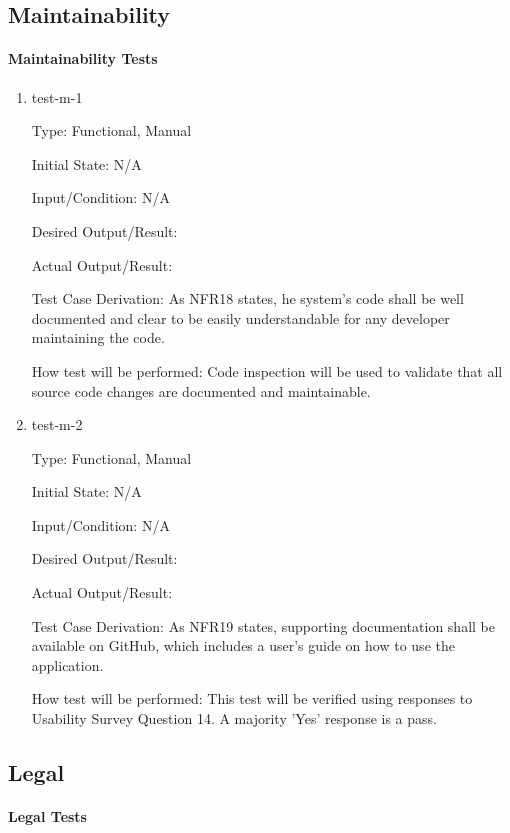 \documentclass[12pt, titlepage]{article}
\begin{document}
\subsection{Maintainability}

\paragraph{Maintainability Tests}

\begin{enumerate}

\item{test-m-1\\}

Type: Functional, Manual		

Initial State: N/A	

Input/Condition: N/A		

Desired Output/Result:  

Actual Output/Result:

Test Case Derivation: As NFR18 states, he system's code shall be well documented and clear to be easily understandable for any developer maintaining the code.

How test will be performed: Code inspection will be used to validate that all source code changes are documented and maintainable. 

\item{test-m-2\\}

Type: Functional, Manual

Initial State: N/A

Input/Condition: N/A

Desired Output/Result:  

Actual Output/Result:

Test Case Derivation: As NFR19 states, supporting documentation shall be available on GitHub, which includes a user's guide on how to use the application.	

How test will be performed: This test will be verified using responses to Usability Survey Question 14. A majority 'Yes' response is a pass.

\end{enumerate}

\subsection{Legal}

\paragraph{Legal Tests}
\end{document}

